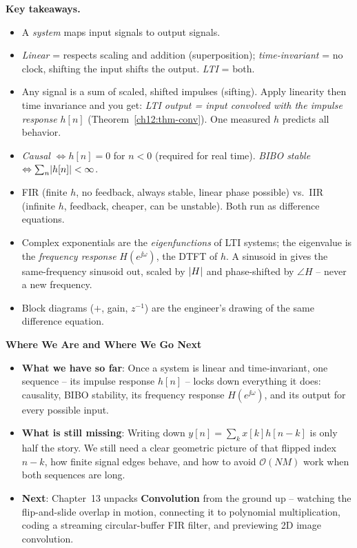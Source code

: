 \begin{recoverybox}
\textbf{Key takeaways.}
\begin{itemize}
  \item A \emph{system} maps input signals to output signals.
  \item \emph{Linear} = respects scaling and addition (superposition);
        \emph{time-invariant} = no clock, shifting the input shifts the
        output. \emph{LTI} = both.
  \item Any signal is a sum of scaled, shifted impulses (sifting). Apply
        linearity then time invariance and you get: \emph{LTI output = input
        convolved with the impulse response} $h[n]$
        (Theorem~\ref{ch12:thm-conv}). One measured $h$ predicts all behavior.
  \item \emph{Causal} $\Leftrightarrow h[n]=0$ for $n<0$ (required for real time).
        \emph{BIBO stable} $\Leftrightarrow \sum_n\lvert h[n]\rvert<\infty$.
  \item FIR (finite $h$, no feedback, always stable, linear phase possible) vs.\
        IIR (infinite $h$, feedback, cheaper, can be unstable). Both run as
        difference equations.
  \item Complex exponentials are the \emph{eigenfunctions} of LTI systems; the
        eigenvalue is the \emph{frequency response} $H(e^{\jj\omega})$, the DTFT
        of $h$. A sinusoid in gives the same-frequency sinusoid out, scaled by
        $\lvert H\rvert$ and phase-shifted by $\angle H$ -- never a new frequency.
  \item Block diagrams ($+$, gain, $z^{-1}$) are the engineer's drawing of the
        same difference equation.
\end{itemize}
\end{recoverybox}

\begin{connectionbox}
\textbf{Where We Are and Where We Go Next}
\begin{itemize}
  \item \textbf{What we have so far}: Once a system is linear and time-invariant, one sequence --
  its impulse response $h[n]$ -- locks down everything it does: causality, BIBO stability, its
  frequency response $H(e^{\jj\omega})$, and its output for every possible input.
  \item \textbf{What is still missing}: Writing down $y[n] = \sum_k x[k]h[n-k]$ is only half the
  story. We still need a clear geometric picture of that flipped index $n-k$, how finite signal
  edges behave, and how to avoid $\mathcal{O}(NM)$ work when both sequences are long.
  \item \textbf{Next}: Chapter~13 unpacks \textbf{Convolution} from the ground up -- watching the
  flip-and-slide overlap in motion, connecting it to polynomial multiplication, coding a streaming
  circular-buffer FIR filter, and previewing 2D image convolution.
\end{itemize}
\end{connectionbox}

